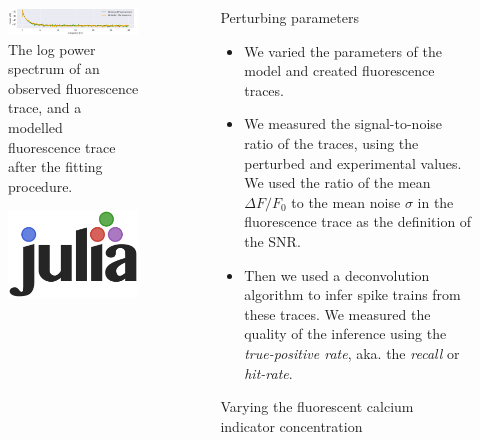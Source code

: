 \documentclass[final]{beamer}
\newlength{\sepwid}
\newlength{\onecolwid}
\begin{document}
\begin{frame}[t]
\begin{columns}[t]
\begin{column}{\onecolwid}
\begin{figure}
	\centering
	\includegraphics[width=\linewidth]{power_spectrum_comparison.png}
	\caption{The log power spectrum of an observed fluorescence trace, and a modelled fluorescence trace after the fitting procedure.}
\end{figure}

\begin{figure}
	\centering
	\includegraphics[width=0.2\linewidth]{Julia_language.png}
\end{figure}

\end{column} %

\begin{column}{\sepwid}\end{column} %

\begin{column}{\onecolwid} %

\begin{block}{Perturbing parameters}

\begin{itemize}
	\item We varied the parameters of the model and created fluorescence traces.
	\item We measured the signal-to-noise ratio of the traces, using the perturbed and experimental values. We used the ratio of the mean $\Delta F/ F_0$ to the mean noise $\sigma$ in the fluorescence trace as the definition of the SNR.
	\item Then we used a deconvolution algorithm \cite{pnevmatikakis} to infer spike trains from these traces. We measured the quality of the inference using the \textit{true-positive rate}, aka. the \textit{recall} or \textit{hit-rate}.
\end{itemize}

\end{block}

\begin{block}{Varying the fluorescent calcium indicator concentration}


\end{block}
\end{column}
\end{columns}
\end{frame}
\end{document}
